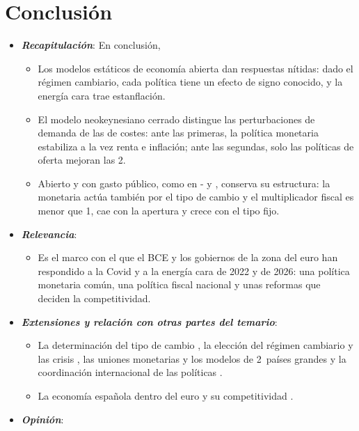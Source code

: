 \documentclass[11pt]{article}
\begin{document}
\section*{Conclusión}

\begin{itemize}
\item \textbf{\emph{Recapitulación}}: En conclusión,
  \begin{itemize}
  \item Los modelos estáticos de economía abierta dan respuestas nítidas: dado el régimen cambiario, cada política tiene un efecto de signo conocido, y la energía cara trae estanflación.
  \item El modelo neokeynesiano cerrado distingue las perturbaciones de demanda de las de costes: ante las primeras, la política monetaria estabiliza a la vez renta e inflación; ante las segundas, solo las políticas de oferta mejoran las 2.
  \item Abierto y con gasto público, como en - y , conserva su estructura: la monetaria actúa también por el tipo de cambio y el multiplicador fiscal es menor que 1, cae con la apertura y crece con el tipo fijo.
  \end{itemize}
\item \textbf{\emph{Relevancia}}:
  \begin{itemize}
  \item Es el marco con el que el BCE y los gobiernos de la zona del euro han respondido a la Covid y a la energía cara de 2022 y de 2026: una política monetaria común, una política fiscal nacional y unas reformas que deciden la competitividad.
  \end{itemize}
\item \textbf{\emph{Extensiones y relación con otras partes del temario}}:
  \begin{itemize}
  \item La determinación del tipo de cambio , la elección del régimen cambiario y las crisis  , las uniones monetarias  y los modelos de 2~países grandes y la coordinación internacional de las políticas .
  \item La economía española dentro del euro y su competitividad .
  \end{itemize}
\item \textbf{\emph{Opinión}}:

\end{itemize}
\end{document}

